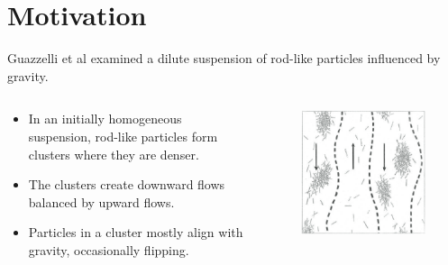 \section{Motivation}
\begin{frame}
    Guazzelli et al examined a dilute suspension of rod-like particles influenced by gravity.
\begin{columns}
	\begin{column}{0.5\textwidth}
		\begin{itemize}
			\item In an initially homogeneous suspension, rod-like particles form clusters where they are denser.
			\item The clusters create downward flows balanced by upward flows.
			\item Particles in a cluster mostly align with gravity, occasionally flipping.
		\end{itemize}
	\end{column}
	\begin{column}{0.5\textwidth}
		\begin{figure}[H]
			\centering
			\includegraphics[scale=0.5]{Bilder/Bild_Particles}
		\end{figure}
	\end{column}
\end{columns}
\end{frame}

